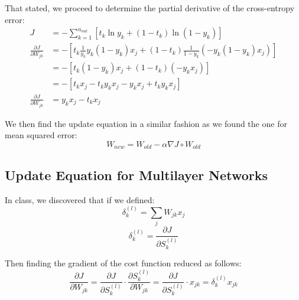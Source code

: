 \documentclass[11pt]{article}
\begin{document}
That stated, we proceed to determine the partial derivative of the cross-entropy error:
\begin{align}
J &= - \sum_{k=1}^{n_{out}}\left[t_k \ln y_k + \left(1- t_k \right)\ln \left( 1- y_k \right) \right] \\
\frac{\partial J}{\partial W_{jk}} &= 
- \left[ t_k \frac{1}{y_k} y_k \left( 1 - y_k \right) x_j + \left( 1 - t_k \right) \frac{1}{1 - y_k} \left( - y_k \left( 1 - y_k \right) x_j \right) \right] \\
&= - \left[ t_k \left( 1 - y_k \right) x_j + \left( 1 - t_k \right) \left( -y_k x_j \right) \right] \\
&= - \left[ t_k x_j - t_k y_k x_j - y_k x _j + t_k y_k x_j \right] \\
\frac{\partial J}{\partial W_{jk}} &= y_k x_j - t_k x_j
\end{align}

We then find the update equation in a similar fashion as we found the one for mean squared error:
\[
	W_{new} = W_{old} - \alpha \nabla J \circ W_{old}
\]  

\subsection{Update Equation for Multilayer Networks}
\newcommand{\skl}{S_k^{(l)}}
\newcommand{\dkl}{\delta_k^{(l)}}
In class, we discovered that if we defined:
\[
\dkl = \sum_j W_{jk} x_j
\]
\[
\dkl = \frac{\partial J}{\partial \skl}
\]

Then finding the gradient of the cost function reduced as follows:
\[
\frac{\partial J}{\partial W_{jk}} = \frac{\partial J}{\partial \skl} \cdot \frac{\partial \skl }{\partial W_{jk}}
 = \frac{\partial J}{\partial \skl} \cdot x_{jk} = \dkl x_{jk}
\]
\end{document}
